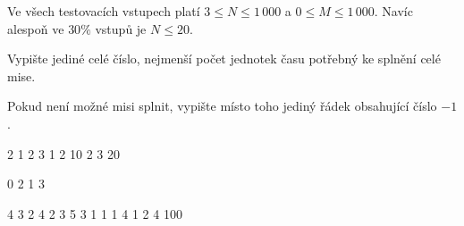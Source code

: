 \smallskip
Ve všech testovacích vstupech platí $3 \le N \le 1\,000$ a $0 \le M \le 1\,000$.
Navíc alespoň ve $30\%$ vstupů je $N\le 20$.


Vypište jediné celé číslo, nejmenší počet jednotek času potřebný ke splnění celé mise.

Pokud není možné misi splnit, vypište místo toho jediný řádek obsahující číslo $-1$.



 2 1 2 3
1 2 10
2 3 20
\sampleEND


\bigskip


 0 2 1 3
\sampleEND


\bigskip


 4 3 2 4
2 3 5
3 1 1
1 4 1
2 4 100
\sampleEND


